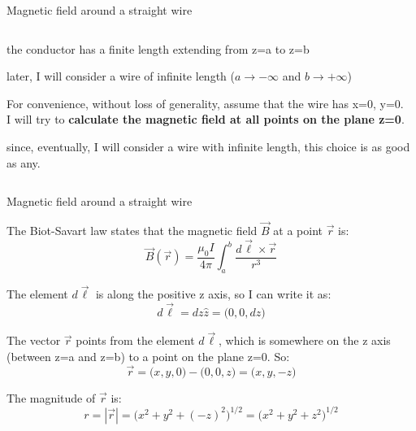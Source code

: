 \begin{frame}{Magnetic field around a straight wire}
\begin{columns}
\begin{column}{0.60\textwidth}
{\begin{itemize}
{      \item the conductor has a finite length extending from z=a to z=b
        \begin{itemize}
        {\small
             \item later, I will consider a wire of infinite length
                       ($a \rightarrow -\infty$ and $b \rightarrow +\infty$)
        }
        \end{itemize}
   }
  \end{itemize}
  For convenience, without loss of generality,
  assume that the wire has x=0, y=0.\\
  \vspace{0.2cm}
  I will try to {\bf calculate the magnetic field at all points on the plane z=0}.
  \begin{itemize}
  {\small
      \item since, eventually, I will consider a wire with infinite length,
                this choice is as good as any.
  }
  \end{itemize}

  }
  \end{column}
\end{columns}

\end{frame}


%
%
%

\begin{frame}{Magnetic field around a straight wire}

The Biot-Savart law states that the magnetic field $\vec{B}$ at a point $\vec{r}$ is:
\begin{equation*}
  \vec{B}(\vec{r}) = \frac{\mu_0I}{4\pi} \int_{a}^{b} \frac{d\vec{\ell} \times \vec{r}}{r^3}
\end{equation*}

The element $d\vec{\ell}$ is along the positive z axis, so I can write it as:
\begin{equation*}
  d\vec{\ell} = dz \hat{z} = \Big( 0, 0, dz \Big)
\end{equation*}

The vector $\vec{r}$ points from the element $d\vec{\ell}$, which is somewhere on the z axis
(between z=a and z=b) to a point on the plane z=0. So:
\begin{equation*}
  \vec{r} = \Big( x, y, 0 \Big) - \Big( 0, 0, z \Big) = \Big( x, y, -z \Big)
\end{equation*}

The magnitude of $\vec{r}$ is:
\begin{equation*}
  r = |\vec{r}| = \Big( x^2 + y^2 + (-z)^2 \Big)^{1/2} = \Big( x^2 + y^2 + z^2 \Big)^{1/2}
\end{equation*}

\end{frame}

